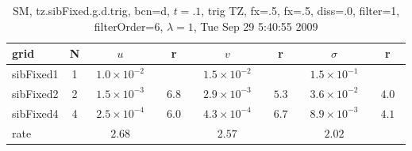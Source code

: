 \begin{table}[hbt]\tableFont %
\begin{center}
\begin{tabular}{|l|c|c|c|c|c|c|c|} \hline 
grid  & N &  $u$  & r &  $v$  & r &  $\sigma$   & r \\ \hline 
           sibFixed1 &     1 & ~$1.0\times10^{ -2}$~ &           & ~$1.5\times10^{ -2}$~ &           & ~$1.5\times10^{ -1}$~ &            \\ \hline
           sibFixed2 &     2 & ~$1.5\times10^{ -3}$~ & ~$  6.8$~ & ~$2.9\times10^{ -3}$~ & ~$  5.3$~ & ~$3.6\times10^{ -2}$~ & ~$  4.0$~  \\ \hline
           sibFixed4 &     4 & ~$2.5\times10^{ -4}$~ & ~$  6.0$~ & ~$4.3\times10^{ -4}$~ & ~$  6.7$~ & ~$8.9\times10^{ -3}$~ & ~$  4.1$~  \\ \hline
    rate             &       &       $2.68$         &       &       $2.57$         &       &       $2.02$         &        \\ \hline
\end{tabular}
\caption{SM, tz.sibFixed.g.d.trig, bcn=d, $t=.1$, trig TZ, fx=.5, fx=.5, diss=.0, filter=1, filterOrder=6, $\lambda=1$, Tue Sep 29  5:40:55 2009}\label{table:tz.sibFixed.g.d.trig}
\end{center}
\end{table}
